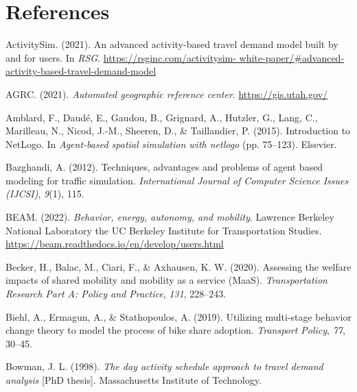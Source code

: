 \documentclass[fancy, masters]{byuthesis}
\newlength{\cslhangindent}
\newlength{\cslentryspacingunit} %
\newenvironment{CSLReferences}[2] %
 {%
  \setlength{\parindent}{0pt}
  \ifodd #1
  \let\oldpar\par
  \def\par{\hangindent=\cslhangindent\oldpar}
  \fi
  \setlength{\parskip}{#2\cslentryspacingunit}
 }%
 {}
\begin{document}
\hypertarget{references}{%
\chapter*{References}\label{references}}

\hypertarget{refs}{}
\begin{CSLReferences}{1}{0}
\leavevmode{}%
ActivitySim. (2021). An advanced activity-based travel demand model built by and for users. In \emph{RSG}. \href{https://rsginc.com/activitysim-\%20white-paper/\#advanced-activity-based-travel-demand-model}{https://rsginc.com/activitysim- white-paper/\#advanced-activity-based-travel-demand-model}

\leavevmode{}%
AGRC. (2021). \emph{Automated geographic reference center}. \url{https://gis.utah.gov/}

\leavevmode{}%
Amblard, F., Daudé, E., Gaudou, B., Grignard, A., Hutzler, G., Lang, C., Marilleau, N., Nicod, J.-M., Sheeren, D., \& Taillandier, P. (2015). Introduction to NetLogo. In \emph{Agent-based spatial simulation with netlogo} (pp. 75--123). Elsevier.

\leavevmode{}%
Bazghandi, A. (2012). Techniques, advantages and problems of agent based modeling for traffic simulation. \emph{International Journal of Computer Science Issues (IJCSI)}, \emph{9}(1), 115.

\leavevmode{}%
BEAM. (2022). \emph{Behavior, energy, autonomy, and mobility}. Lawrence Berkeley National Laboratory the UC Berkeley Institute for Transportation Studies. \url{https://beam.readthedocs.io/en/develop/users.html}

\leavevmode{}%
Becker, H., Balac, M., Ciari, F., \& Axhausen, K. W. (2020). Assessing the welfare impacts of shared mobility and mobility as a service (MaaS). \emph{Transportation Research Part A: Policy and Practice}, \emph{131}, 228--243.

\leavevmode{}%
Biehl, A., Ermagun, A., \& Stathopoulos, A. (2019). Utilizing multi-stage behavior change theory to model the process of bike share adoption. \emph{Transport Policy}, \emph{77}, 30--45.

\leavevmode{}%
Bowman, J. L. (1998). \emph{The day activity schedule approach to travel demand analysis} {[}PhD thesis{]}. Massachusetts Institute of Technology.


\end{CSLReferences}
\end{document}
